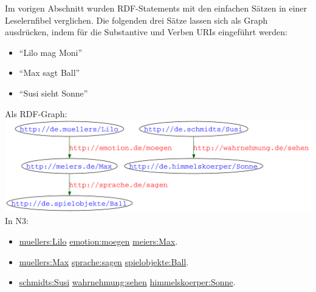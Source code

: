 \begin{bsp}
Im vorigen Abschnitt wurden RDF-Statements mit den einfachen Sätzen in einer Leselernfibel verglichen.
Die folgenden drei Sätze lassen sich als Graph ausdrücken, indem für die Substantive und Verben URIs eingeführt werden:
\begin{itemize}
\item{"`Lilo mag Moni"'}
\item{"`Max sagt Ball"'}
\item{"`Susi sieht Sonne"'}
\end{itemize}
Als RDF-Graph:\\
\includegraphics[width=\textwidth]{img/pdf/fibel_fontsize_20.pdf}\\
In N3:
\begin{itemize}
\item{\url{muellers:Lilo} \url{emotion:moegen} \url{meiers:Max}.}
\item{\url{muellers:Max} \url{sprache:sagen} \url{spielobjekte:Ball}.}
\item{\url{schmidts:Susi} \url{wahrnehmung:sehen} \url{himmelskoerper:Sonne}.}
\end{itemize}
 
\end{bsp}
% 

